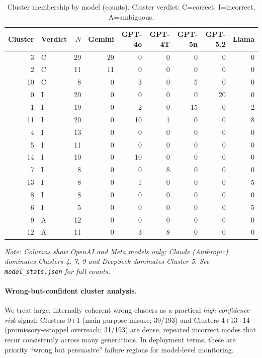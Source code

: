 \documentclass[11pt]{article}
\begin{document}
\begin{table}[ht]
\centering
\caption{Cluster membership by model (counts). Cluster verdict: C=correct, I=incorrect, A=ambiguous.}
\label{tab:cluster_model_breakdown}
\setlength{\tabcolsep}{4pt}
\small
\begin{tabular}{rlr|rrrrrr}
\toprule
Cluster & Verdict & $N$ & Gemini & GPT-4o & GPT-4T & GPT-5n & GPT-5.2 & Llama \\
\midrule
3  & C & 29 & 29 & 0 & 0 & 0 & 0 & 0 \\
2  & C & 11 & 11 & 0 & 0 & 0 & 0 & 0 \\
10 & C &  8 &  0 & 3 & 0 & 5 & 0 & 0 \\
\midrule
0  & I & 20 &  0 & 0 & 0 & 0 & 20 & 0 \\
1  & I & 19 &  0 & 2 & 0 &15 &  0 & 2 \\
11 & I & 20 &  0 &10 & 1 & 0 &  0 & 8 \\
4  & I & 13 &  0 & 0 & 0 & 0 &  0 & 0 \\ %
5  & I & 11 &  0 & 0 & 0 & 0 &  0 & 0 \\ %
14 & I & 10 &  0 &10 & 0 & 0 &  0 & 0 \\
7  & I &  8 &  0 & 0 & 8 & 0 &  0 & 0 \\ %
13 & I &  8 &  0 & 1 & 0 & 0 &  0 & 5 \\ %
8  & I &  8 &  0 & 0 & 0 & 0 &  0 & 0 \\ %
6  & I &  5 &  0 & 0 & 0 & 0 &  0 & 5 \\
\midrule
9  & A & 12 &  0 & 0 & 0 & 0 &  0 & 0 \\ %
12 & A & 11 &  0 & 3 & 8 & 0 &  0 & 0 \\
\bottomrule
\end{tabular}
\vspace{0.5em}

\noindent\textit{Note: Columns show OpenAI and Meta models only; Claude (Anthropic) dominates Clusters 4, 7, 9 and DeepSeek dominates Cluster 5. See \texttt{model\_stats.json} for full counts.}
\end{table}

\paragraph{Wrong-but-confident cluster analysis.}
We treat large, internally coherent wrong clusters as a practical \emph{high-confidence-risk} signal: Clusters 0+1 (main-purpose misuse; 39/193) and Clusters 4+13+14 (promissory-estoppel overreach; 31/193) are dense, repeated incorrect modes that recur consistently across many generations. In deployment terms, these are priority ``wrong but persuasive'' failure regions for model-level monitoring.
\end{document}
